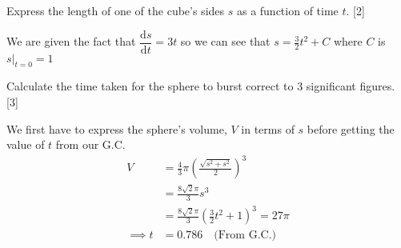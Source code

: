\documentclass[12pt, a4 paper]{article}
\begin{document}
\begin{outline}[enumerate]
 \2 Express the length of one of the cube's sides $s$ as a function of time $t$. \hfill[2]
 \begin{answer}
  We are given the fact that $\dfrac{\mathrm{d}s}{\mathrm{d}t}=3t$ so we can see that $s=\frac{3}{2}t^2+C$ where $C$ is $s|_{t=0}=1$
 \end{answer}

 \2 Calculate the time taken for the sphere to burst correct to 3 significant figures. \hfill[3]
 \begin{answer}
  We first have to express the sphere's volume, $V$ in terms of $s$ before getting the value of $t$ from our G.C.
  \begin{align*}
   V          & = \frac{4}{3}\pi \left(\frac{\sqrt{s^2+s^2}}{2}\right)^3      \\
              & = \frac{8\sqrt2\pi}{3}s^3                                     \\
              & = \frac{8\sqrt2\pi}{3}\left(\frac{3}{2}t^2+1\right)^3 = 27\pi \\
   \implies t & = 0.786 \quad\textrm{(From G.C.)}\quad
  \end{align*}
 \end{answer}


\end{outline}
\end{document}
